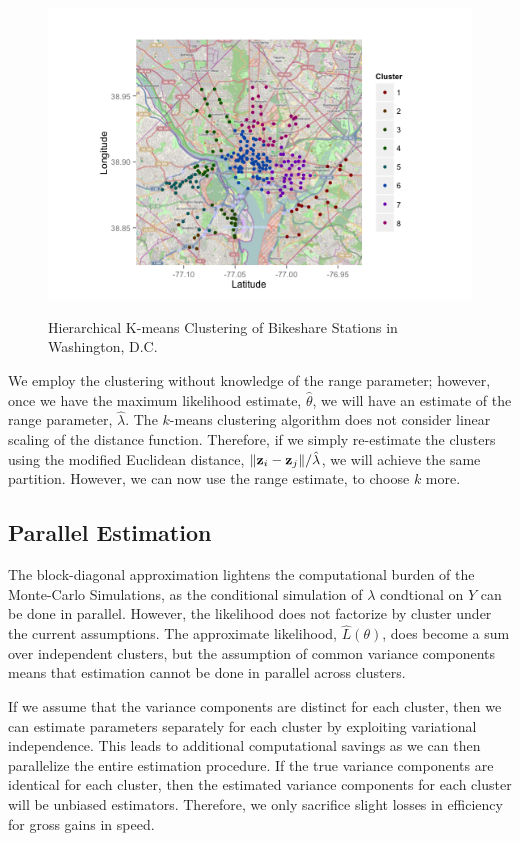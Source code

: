\documentclass{acm_proc_article-sp}
\begin{document}
\begin{figure} [!h]
\caption{Hierarchical K-means Clustering of Bikeshare Stations in Washington, D.C.}
\centering
\includegraphics[scale = 0.5]{cluster_map.png}
\label{fig:cluster_map}
\end{figure}

We employ the clustering without knowledge of the range parameter; however, once we have the maximum likelihood estimate, $\hat{\theta}$, we will have an estimate of the range parameter, $\hat{\lambda}$.  The $k$-means clustering algorithm does not consider linear scaling of the distance function.  Therefore, if we simply re-estimate the clusters using the modified Euclidean distance, $\|{\bf z}_i - {\bf z}_j \| / \hat{\lambda}$, we will achieve the same partition.  However, we can now use the range estimate, to choose $k$ more. 

\subsection{Parallel Estimation}

The block-diagonal approximation lightens the computational burden of the Monte-Carlo Simulations, as the conditional simulation of $\lambda$ condtional on $Y$ can be done in parallel.  However, the likelihood does not factorize by cluster under the current assumptions.  The approximate likelihood, $\hat{L} (\theta)$, does become a sum over independent clusters, but the assumption of common variance components means that estimation cannot be done in parallel across clusters.

If we assume that the variance components are distinct for each cluster, then we can estimate parameters separately for each cluster by exploiting variational independence.  This leads to additional computational savings as we can then parallelize the entire estimation procedure.  If the true variance components are identical for each cluster, then the estimated variance components for each cluster will be unbiased estimators.  Therefore, we only sacrifice slight losses in efficiency for gross gains in speed.  
\end{document}
